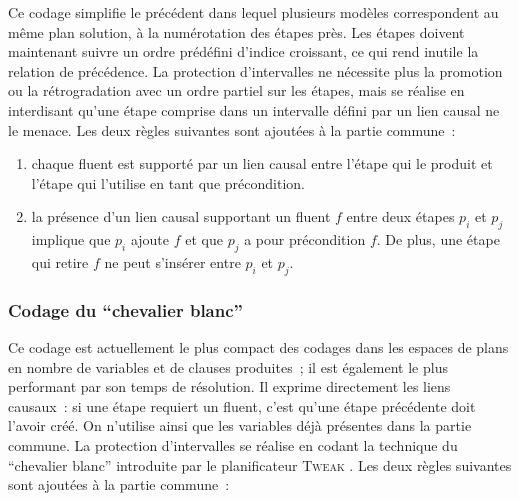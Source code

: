 {Ce codage simplifie le précédent dans lequel plusieurs modèles correspondent au
même plan solution, à la numérotation des étapes près. Les étapes doivent
maintenant suivre un ordre prédéfini d'indice croissant, ce qui rend inutile la
relation de précédence. La protection d'intervalles ne nécessite plus la
promotion ou la rétrogradation avec un ordre partiel sur les étapes, mais se
réalise en interdisant qu'une étape comprise dans un intervalle défini par un
lien causal ne le menace. Les deux règles suivantes sont ajoutées à la partie
commune~:

\begin{enumerate}
\item {} chaque fluent est supporté par un
  lien causal entre l'étape qui le produit et l'étape qui l'utilise en tant que
  précondition.
\item {} la présence d'un lien
  causal supportant un fluent $f$ entre deux étapes $p_i$ et $p_j$
  implique que $p_i$ ajoute $f$ et que $p_j$ a pour précondition
  $f$. De plus, une étape qui retire $f$ ne peut s'insérer entre $p_i$ et
  $p_j$.
\end{enumerate}

\subsubsection{Codage du \enquote{chevalier blanc}}

Ce codage est actuellement le plus compact des codages dans les espaces de plans
en nombre de variables et de clauses produites~; il est également le plus
performant par son temps de résolution. Il exprime directement les liens
causaux~: si une étape requiert un fluent, c'est qu'une étape précédente doit
l'avoir créé. On n'utilise ainsi que les variables déjà présentes dans la partie
commune. La protection d'intervalles se réalise en codant la technique du
\enquote{chevalier blanc} introduite par le planificateur \textsc{Tweak}
\cite{Cha87}. Les deux règles suivantes sont ajoutées à la partie commune~:


}
